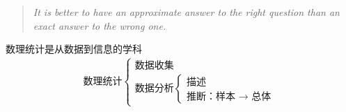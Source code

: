 \begin{quote}
	\textit{It is better to have an approximate answer to the right question than an exact answer to the wrong one.}

\end{quote}
数理统计是从数据到信息的学科
\begin{align*}
	\text{数理统计}\begin{cases}
		\text{数据收集}\\
		\text{数据分析}\begin{cases}
			\text{描述}\\
			\text{推断：样本 }\to\text{ 总体}
		\end{cases}
	\end{cases}
\end{align*}